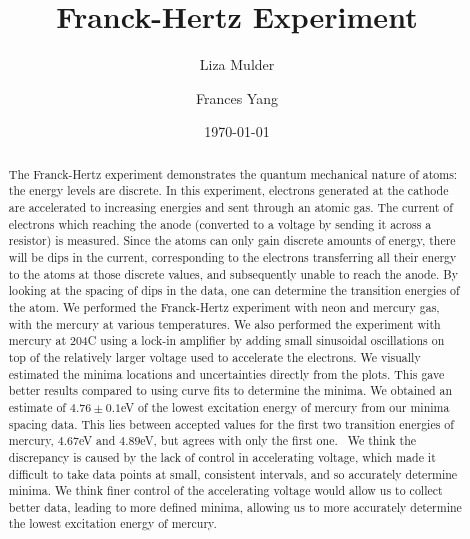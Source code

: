 \documentclass[prb,preprint]{revtex4-1}
\begin{document}

\title{Franck-Hertz Experiment}


\author{Liza Mulder}


\author{Frances Yang}


\date{\today}



\begin{abstract}
The Franck-Hertz experiment demonstrates the quantum mechanical nature of atoms: the energy levels are discrete. 
In this experiment, electrons generated at the cathode are accelerated to increasing energies and sent through an atomic gas. The current of electrons which reaching the anode (converted to a voltage by sending it across a resistor) is measured. 
Since the atoms can only gain discrete amounts of energy, there will be dips in the current, corresponding to the electrons transferring all their energy to the atoms at those discrete values, and subsequently unable to reach the anode.
By looking at the spacing of dips in the data, one can determine the transition energies of the atom. 
We performed the Franck-Hertz experiment with neon and mercury gas, with the mercury at various temperatures. 
We also performed the experiment with mercury at 204\degree C using a lock-in amplifier by adding small sinusoidal oscillations on top of the relatively larger voltage used to accelerate the electrons.
We visually estimated the minima locations and uncertainties directly from the plots. 
This gave better results compared to using curve fits to determine the minima.
We obtained an estimate of $4.76\pm 0.1$eV of the lowest excitation energy of mercury from our minima spacing data.
This lies between accepted values for the first two transition energies of mercury,  $4.67$eV and $4.89$eV, but agrees with only the first one.~\cite{new}
We think the discrepancy is caused by the lack of control in accelerating voltage, which made it difficult to take data points at small, consistent intervals, and so accurately determine minima.
We think finer control of the accelerating voltage would allow us to collect better data, leading to more defined minima, allowing us to more accurately determine the lowest excitation energy of mercury. 
\end{abstract}
\end{document}
